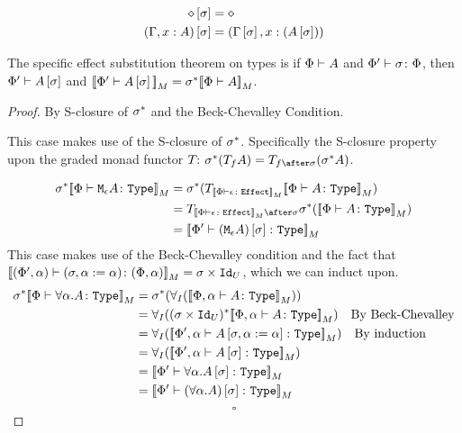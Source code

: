 \documentclass{Report}
\begin{document}
\begin{align*}
    \diamond\left[\sigma\right] & = \diamond \\
    (\Gamma, x: A)\left[\sigma\right] &= (\Gamma\left[\sigma\right], x:(A\left[\sigma\right]))\\
\end{align*}


\begin{theorem}
    The specific effect substitution theorem on types is if $\Phi\vdash A$ and $\Phi' \vdash \sigma \colon \Phi$, then $\Phi'\vdash A\left[\sigma\right]$ and ${\bf [\![}\Phi'\vdash A\left[\sigma\right]{\bf ]\!]}_M = \sigma^*{\bf [\![}\Phi\vdash A{\bf ]\!]}_M$.
\end{theorem}

\begin{proof}
    By S-closure of $\sigma^*$ and the Beck-Chevalley Condition.

    This case makes use of the S-closure of $\sigma^*$. Specifically the S-closure property upon the graded monad functor $T_{}{}$: $\si\star(\T{f}{A}) = \T{f\after\si}{(\si\star A)}$.


    \begin{align}
        \si\star\deno{\typerelation{\P}{\mea}{\type}} & =  \si\star(\T{\deno{\typerelation{\P}{\e}{\effect}}}{\deno{\typerelation{\P}{A}{\type}}})\\
        &= \T{\deno{\typerelation{\P}{\e}{\effect}}\after\si}{\si\star(\deno{\typerelation{\P}{A}{\type}})}\\
        & = \deno{\typerelation{\P'}{(\mea)\ssi}{\type}}
    \end{align}
    This case makes use of the Beck-Chevalley condition and the fact that ${\bf [\![}(\Phi', \alpha) \vdash (\sigma, \alpha:=\alpha) \colon (\Phi, \alpha){\bf ]\!]}_M = \sigma\times\texttt{Id}_{U}$, which we can induct upon.
        \begin{align}
            \si\star\deno{\typerelation{\P}{\all{\a}A}{\type}} & = \si\star(\allI(\deno{\typerelation{\P,\a}{A}{\type}}))\\
            & = \allI((\si\times\Id{U})\star\deno{\typerelation{\P,\a}{A}{\type}})\qt{By Beck-Chevalley}\\
            & = \allI(\deno{\typerelation{\P',\a}{A\sub{\si, \a\setto\a}}{\type}})\qt{By induction}\\
            & = \allI(\deno{\typerelation{\P',\a}{A\ssi}{\type}})\\
            & = \deno{\typerelation{\P'}{\all{\a}{A\ssi}}{\type}}\\
            & = \deno{\typerelation{\P'}{(\all{\a}{A})\ssi}{\type}}\\
        \end{align}
        $$\square$$
\end{proof}
\end{document}
